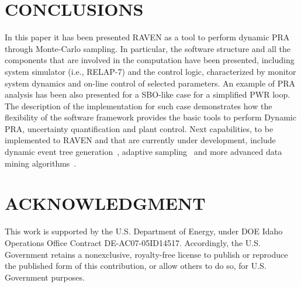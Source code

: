 \documentclass{mc2013}
\begin{document}
\section{CONCLUSIONS}
In this paper it has been presented RAVEN as a tool to perform dynamic PRA through Monte-Carlo sampling. In particular, the software structure and all the components that are involved in the computation have been presented, including system simulator (i.e., RELAP-7) and the control logic, characterized by monitor system dynamics and on-line control of selected parameters.
An example of PRA analysis has been also presented for a SBO-like case for a simplified PWR loop. 
The description of the implementation for such case demonstrates how the flexibility of the software framework provides the basic tools to perform Dynamic PRA, uncertainty quantification and plant control. 
Next capabilities, to be implemented to RAVEN and that are currently under development, include dynamic event tree generation~\cite{ADAPTHakobyan}, adaptive sampling~\cite{mandelliSVMANS} and more advanced data mining algorithms~\cite{mandelliEsrel2011}. 
\section*{ACKNOWLEDGMENT}
This work is supported by the U.S. Department of Energy, under DOE Idaho Operations Office Contract DE-AC07-05ID14517. Accordingly, the U.S. Government retains a nonexclusive, royalty-free license to publish or reproduce the published form of this contribution, or allow others to do so, for U.S. Government purposes.



\end{document}
